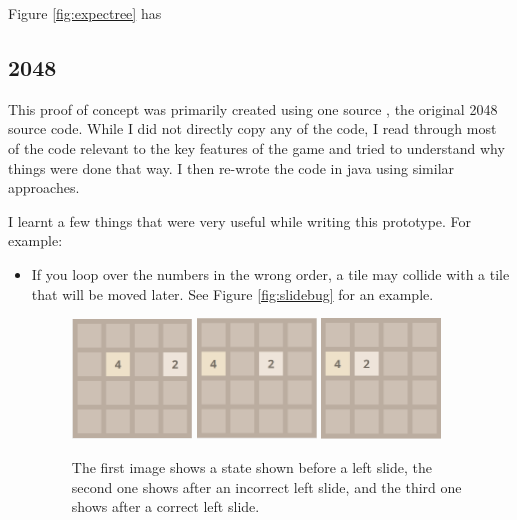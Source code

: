 \documentclass{article}
\begin{document}
Figure \ref{fig:expectree} has

\subsection{2048}
\label{subsec:2048}
This proof of concept was primarily created using one source \cite{source2048}, the original 2048 source code. While I did not
directly copy any of the code, I read through most of the code relevant to the key features of the game and tried to understand 
why things were done that way. I then re-wrote the code in java using similar approaches.

I learnt a few things that were very useful while writing this prototype. For example: 
\begin{itemize}
    \item If you loop over the numbers in the wrong order, a tile may collide with a tile that will be moved later. 
    See Figure \ref{fig:slidebug} for an example.
    \begin{figure}
        \centering
        \includegraphics[width=0.3\textwidth]{2048_slide.png}
        \includegraphics[width=0.3\textwidth]{2048_slide2.png}
        \includegraphics[width=0.3\textwidth]{2048_slide3.png}
        \caption{The first image shows a state shown before a left slide, the second one shows after an incorrect left slide, and the third one shows after a correct left slide.}

\end{figure}
\end{itemize}
\end{document}
